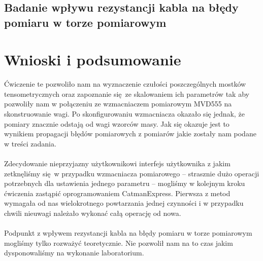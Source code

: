 \documentclass[a4paper, 12pt, titlepage]{article}
\begin{document}
		\subsection{Badanie wpływu rezystancji kabla na błędy pomiaru w torze pomiarowym}
	\section{Wnioski i podsumowanie}
		Ćwiczenie te pozwoliło nam na wyznaczenie czułości poszczególnych mostków tensometrycznych oraz zapoznanie się ze skalowaniem ich parametrów tak aby pozwoliły nam w połączeniu ze wzmacniaczem pomiarowym MVD555 na skonstruowanie wagi. Po skonfigurowaniu wzmacniacza okazało się jednak, że pomiary znacznie odstają od wagi wzorców masy. Jak się okazuje jest to wynikiem propagacji błędów pomiarowych z pomiarów jakie zostały nam podane w treści zadania.
		\\
		\\
		Zdecydowanie nieprzyjazny użytkownikowi interfejs użytkownika z jakim zetknęliśmy się w przypadku wzmacniacza pomiarowego -- strasznie dużo operacji potrzebnych dla ustawienia jednego parametru -- mogliśmy w kolejnym kroku ćwiczenia zastąpić oprogramowaniem Catman\textregistered Express. Pierwsza z metod wymagała od nas wielokrotnego powtarzania jednej czynności i w przypadku chwili nieuwagi należało wykonać całą operację od nowa. 
		\\
		\\
		Podpunkt z wpływem rezystancji kabla na błędy pomiaru w torze pomiarowym mogliśmy tylko rozważyć teoretycznie. Nie pozwolił nam na to czas jakim dysponowaliśmy na wykonanie laboratorium.
\end{document}
